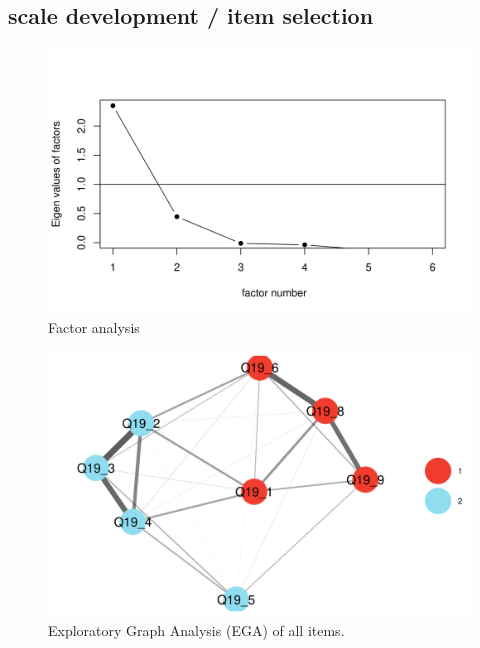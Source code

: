 \documentclass[
  ,jou,floatsintext]{apa6}
\begin{document}
\hypertarget{scale-development-item-selection}{%
\subsection{scale development / item selection}\label{scale-development-item-selection}}

\begin{figure}

{\centering \includegraphics[width=1\linewidth]{plots/reason_scree6} 

}

\caption{Factor analysis}\label{fig:factors}
\end{figure}

\begin{figure}

{\centering \includegraphics[width=1\linewidth]{plots/reason_ega} 

}

\caption{Exploratory Graph Analysis (EGA) of all items.}\label{fig:egafull}
\end{figure}
\end{document}
